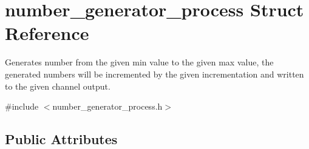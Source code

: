 \hypertarget{structnumber__generator__process}{\section{number\-\_\-generator\-\_\-process Struct Reference}
\label{structnumber__generator__process}
}


Generates number from the given min value to the given max value, the generated numbers will be incremented by the given incrementation and written to the given channel output.  




{\ttfamily \#include $<$number\-\_\-generator\-\_\-process.\-h$>$}

\subsection*{Public Attributes}
